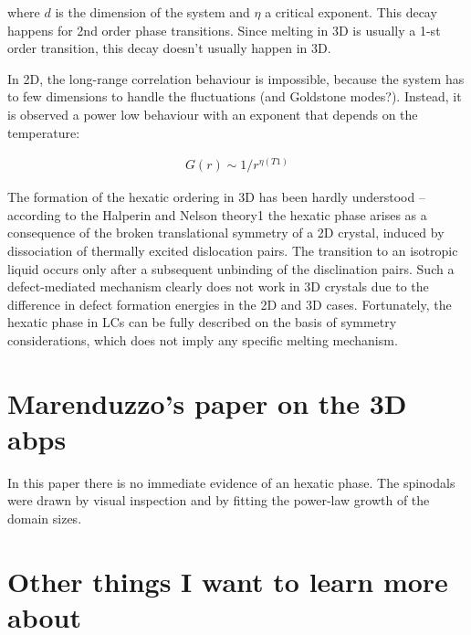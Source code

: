 \documentclass[a4paper]{article}
\begin{document}
where $d$ is the dimension of the system and $\eta$ a critical exponent. This decay happens for 2nd order phase transitions. Since melting in 3D is usually a 1-st order transition, this decay doesn't usually happen in 3D.

In 2D, the long-range correlation behaviour is impossible, because the system has to few dimensions to handle the fluctuations (and Goldstone modes?). Instead, it is observed a power low behaviour with an exponent that depends on the temperature:

\begin{align*}
	G(r)\sim 1/r^{\eta(T1)}
\end{align*}

The formation of the hexatic ordering in 3D has been hardly understood – according to the Halperin and Nelson theory1 the hexatic phase arises as a consequence of the broken translational symmetry of a 2D crystal, induced by dissociation of thermally excited dislocation pairs. The transition to an isotropic liquid occurs only after a subsequent unbinding of the disclination pairs. Such a defect-mediated mechanism clearly does not work in 3D crystals due to the difference in defect formation energies in the 2D and 3D cases. Fortunately, the hexatic phase in LCs can be fully described on the basis of symmetry considerations, which does not imply any specific melting mechanism.

\section{Marenduzzo's paper on the 3D abps }

In this paper there is no immediate evidence of an hexatic phase. The spinodals were drawn by visual inspection and by fitting the power-law growth of the domain sizes.

\section*{Other things I want to learn more about}
\end{document}
